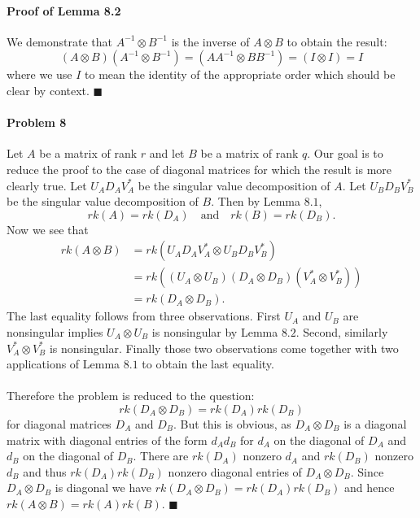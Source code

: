 \documentclass[letterpaper,12pt,oneside,onecolumn]{article}
\begin{document}
\paragraph{Proof of Lemma 8.2}
We demonstrate that $A^{-1} \otimes B^{-1}$ is the inverse of $A \otimes B$ to obtain the result:
$$(A \otimes B)(A^{-1} \otimes B^{-1}) = (AA^{-1} \otimes BB^{-1}) = (I \otimes I) = I $$
where we use $I$ to mean the identity of the appropriate order which should be clear by context. $\blacksquare$
\paragraph{Problem 8}
Let $A$ be a matrix of rank $r$ and let $B$ be a matrix of rank $q$. Our goal is to reduce the proof to the case of diagonal matrices for which the result is more clearly true. Let $U_AD_AV_A^*$ be the singular value decomposition of $A$. Let $U_BD_BV_B^*$ be the singular value decomposition of $B$. Then by Lemma $8.1$,
$$rk(A) = rk(D_A) \quad \text{and} \quad rk(B) = rk(D_B).$$ 
Now we see that
\begin{align*}
rk(A\otimes B) &= rk(U_AD_AV_A^* \otimes U_BD_BV_B^*) \\
&= rk((U_A \otimes U_B)(D_A \otimes D_B)(V_A^* \otimes V_B^*)) \\
&= rk(D_A \otimes D_B).
\end{align*}
The last equality follows from three observations. First $U_A$ and $U_B$ are nonsingular implies $U_A \otimes U_B$ is nonsingular by Lemma $8.2$. Second, similarly $V_A^* \otimes V_B^*$ is nonsingular. Finally those two observations come together with two applications of Lemma $8.1$ to obtain the last equality.
\paragraph{}
Therefore the problem is reduced to the question:
$$rk(D_A \otimes D_B) = rk(D_A)rk(D_B) $$
for diagonal matrices $D_A$ and $D_B$. But this is obvious, as $D_A \otimes D_B$ is a diagonal matrix with diagonal entries of the form $d_Ad_B$ for $d_A$ on the diagonal of $D_A$ and $d_B$ on the diagonal of $D_B$. There are $rk(D_A)$ nonzero $d_A$ and $rk(D_B)$ nonzero $d_B$ and thus $rk(D_A)rk(D_B)$ nonzero diagonal entries of $D_A \otimes D_B$. Since $D_A \otimes D_B$ is diagonal we have $rk(D_A \otimes D_B) = rk(D_A)rk(D_B)$ and hence $rk(A \otimes B) = rk(A)rk(B)$. $\blacksquare$
\end{document}
